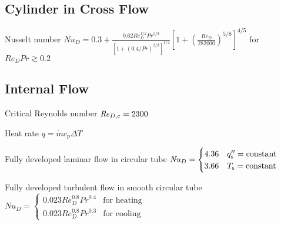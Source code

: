 \documentclass{article}
\begin{document}
\subsection{Cylinder in Cross Flow}
\begin{description*}
\item[Nusselt number]
  \(\overline{\mathit{Nu}}_D
  = 0.3 + \frac{0.62\mathit{Re}_D^{1/2}\mathit{Pr}^{1/3}}
               {{\left[1+{(0.4/\mathit{Pr})}^{2/3}\right]}^{1/4}}
          {\left[1 + {\left(\frac{\mathit{Re}_D}{282000}\right)}^{5/8}\right]}^{4/5}\)
  for \(\mathit{Re}_D\mathit{Pr} \gtrsim 0.2\)
\end{description*}

\subsection{Internal Flow}
\begin{description*}
\item[Critical Reynolds number]
  \(\mathit{Re}_{D,\mathrm{c}} = \num{2300}\)
\item[Heat rate]
  \(q = \dot{m}c_p\Delta{}T\)
\item[Fully developed laminar flow in circular tube]
  \(\mathit{Nu}_D =
  \begin{cases}
    4.36 & q_{\mathrm{s}}'' = \textrm{constant} \\
    3.66 & T_{\mathrm{s}} = \textrm{constant}
  \end{cases}\)
\item[Fully developed turbulent flow in smooth circular tube]
  \(\mathit{Nu}_D =
  \begin{cases}
    0.023\mathit{Re}_D^{0.8}\mathit{Pr}^{0.4} & \textrm{for heating} \\
    0.023\mathit{Re}_D^{0.8}\mathit{Pr}^{0.3} & \textrm{for cooling}
  \end{cases}\)
\end{description*}
\end{document}
